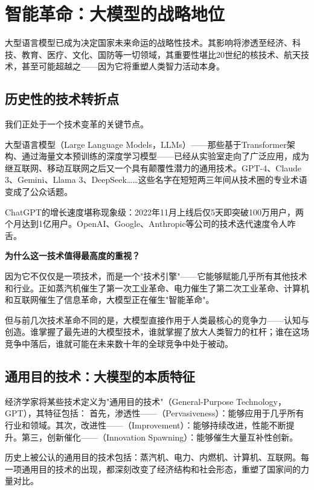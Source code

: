 \chapter{智能革命：大模型的战略地位}

大型语言模型已成为决定国家未来命运的战略性技术。其影响将渗透至经济、科技、教育、医疗、文化、国防等一切领域，其重要性堪比20世纪的核技术、航天技术，甚至可能超越之——因为它将重塑人类智力活动本身。

\section{历史性的技术转折点}

我们正处于一个技术变革的关键节点。

大型语言模型（Large Language Models，LLMs）——那些基于Transformer架构、通过海量文本预训练的深度学习模型——已经从实验室走向了广泛应用，成为继互联网、移动互联网之后又一个具有颠覆性潜力的通用技术。GPT-4、Claude 3、Gemini、Llama 3、DeepSeek……这些名字在短短两三年间从技术圈的专业术语变成了公众话题。

ChatGPT的增长速度堪称现象级：2022年11月上线后仅5天即突破100万用户，两个月达到1亿用户。OpenAI、Google、Anthropic等公司的技术迭代速度令人咋舌。

\textbf{为什么这一技术值得最高度的重视？}

因为它不仅仅是一项技术，而是一个"技术引擎"——它能够赋能几乎所有其他技术和行业。正如蒸汽机催生了第一次工业革命、电力催生了第二次工业革命、计算机和互联网催生了信息革命，大模型正在催生"智能革命"。

但与前几次技术革命不同的是，大模型直接作用于人类最核心的竞争力——认知与创造。谁掌握了最先进的大模型技术，谁就掌握了放大人类智力的杠杆；谁在这场竞争中落后，谁就可能在未来数十年的全球竞争中处于被动。

\section{通用目的技术：大模型的本质特征}

经济学家将某些技术定义为"通用目的技术"（General-Purpose Technology，GPT），其特征包括：
首先，渗透性——（Pervasiveness）：能够应用于几乎所有行业和领域。其次，改进性——（Improvement）：能够持续改进，性能不断提升。第三，创新催化——（Innovation Spawning）：能够催生大量互补性创新。

历史上被公认的通用目的技术包括：蒸汽机、电力、内燃机、计算机、互联网。每一项通用目的技术的出现，都深刻改变了经济结构和社会形态，重塑了国家间的力量对比。

